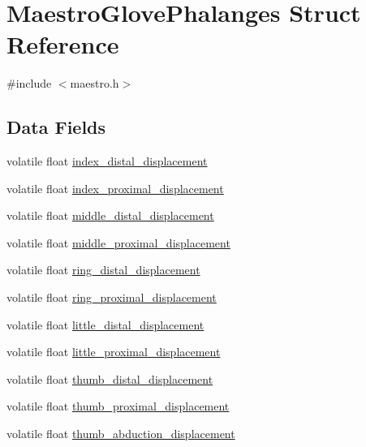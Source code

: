 \hypertarget{struct_maestro_glove_phalanges}{}\section{Maestro\+Glove\+Phalanges Struct Reference}
\label{struct_maestro_glove_phalanges}


{\ttfamily \#include $<$maestro.\+h$>$}

\subsection*{Data Fields}
\begin{DoxyCompactItemize}
\item 
volatile float \hyperlink{struct_maestro_glove_phalanges_ab8360de608dab76b64bd827ad37b9ca3}{index\+\_\+distal\+\_\+displacement}
\item 
volatile float \hyperlink{struct_maestro_glove_phalanges_afc851f9bed16479413ea651466410b20}{index\+\_\+proximal\+\_\+displacement}
\item 
volatile float \hyperlink{struct_maestro_glove_phalanges_ab78a80f90e0057772eeb2d17c34be642}{middle\+\_\+distal\+\_\+displacement}
\item 
volatile float \hyperlink{struct_maestro_glove_phalanges_a1001780a70c96ba6861eadd59291da7a}{middle\+\_\+proximal\+\_\+displacement}
\item 
volatile float \hyperlink{struct_maestro_glove_phalanges_a525eb3b2c13125c38d55404323d37f0d}{ring\+\_\+distal\+\_\+displacement}
\item 
volatile float \hyperlink{struct_maestro_glove_phalanges_a84f08e3f05e0d711dbfdfb22fed2220f}{ring\+\_\+proximal\+\_\+displacement}
\item 
volatile float \hyperlink{struct_maestro_glove_phalanges_a0b6ab557049fd52686a3e0e7097228ed}{little\+\_\+distal\+\_\+displacement}
\item 
volatile float \hyperlink{struct_maestro_glove_phalanges_a7b5f1cd24646820c309155815075166b}{little\+\_\+proximal\+\_\+displacement}
\item 
volatile float \hyperlink{struct_maestro_glove_phalanges_a37876d8048e98e396c3485e9b25d0111}{thumb\+\_\+distal\+\_\+displacement}
\item 
volatile float \hyperlink{struct_maestro_glove_phalanges_a41354d5699846c110ccbde25f10b2a6f}{thumb\+\_\+proximal\+\_\+displacement}
\item 
volatile float \hyperlink{struct_maestro_glove_phalanges_aec82b7b4c402d892dc5602d77f725959}{thumb\+\_\+abduction\+\_\+displacement}

\end{DoxyCompactItemize}
